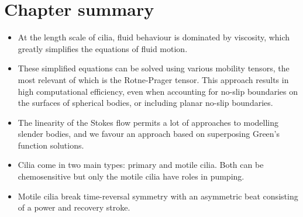 \section{Chapter summary}

\begin{itemize}
    \item At the length scale of cilia, fluid behaviour is dominated by viscosity, which greatly simplifies the equations of fluid motion.
    \item These simplified equations can be solved using various mobility tensors, the most relevant of which is the Rotne-Prager tensor. This approach results in high computational efficiency, even when accounting for no-slip boundaries on the surfaces of spherical bodies, or including planar no-slip boundaries.
    \item The linearity of the Stokes flow permits a lot of approaches to modelling slender bodies, and we favour an approach based on superposing Green's function solutions.
    \item Cilia come in two main types: primary and motile cilia. Both can be chemosensitive but only the motile cilia have roles in pumping.
    \item Motile cilia break time-reversal symmetry with an asymmetric beat consisting of a power and recovery stroke.
\end{itemize}

